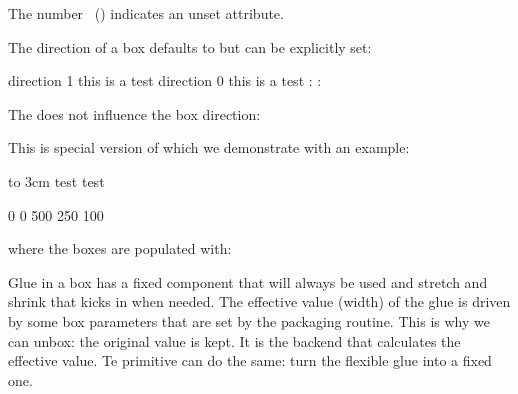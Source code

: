 The number \the\attributeunsetvalue\ (\tohexadecimal\attributeunsetvalue)
indicates an unset attribute.

\stopnewprimitive

\startnewprimitive[title={\prm {boxdirection}}]

The direction of a box defaults to  but can be explicitly set:

\startbuffer
{}\hbox direction 1 {this is a test}
\hbox direction 0 {this is a test}
\the{}: 
\the{}: 
\stopbuffer

\typebuffer

The  does not influence the box direction:

\startlines \getbuffer \stoplines

\stopnewprimitive

\startnewprimitive[title={\prm {boxfinalize}}]

This is special version of  which we demonstrate
with an example:

\startbuffer[setthem]
 to 3cm{\hsize 2cm test test}
\stopbuffer

\startbuffer[usethem]
 0   %
 0   %
 500 %
 250 %
 100 %

\hpack\bgroup
    \quad{}\quad{}\quad{}\quad{}
\egroup
\stopbuffer

\typebuffer[usethem]

where the boxes are populated with:

\typebuffer[setthem]

\startlinecorrection
{}
\stoplinecorrection

\stopnewprimitive

\startnewprimitive[title={\prm {boxfreeze}}]

Glue in a box has a fixed component that will always be used and stretch and
shrink that kicks in when needed. The effective value (width) of the glue is
driven by some box parameters that are set by the packaging routine. This is why
we can unbox: the original value is kept. It is the backend that calculates the
effective value. Te  primitive can do the same: turn the flexible
glue into a fixed one.

